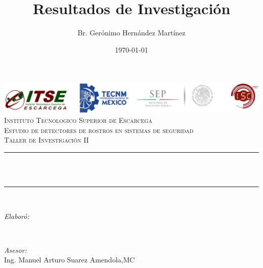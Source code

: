 \documentclass[12pt] {report}
\title{Resultados de Investigación}
\author{Br. Gerónimo Hernández Martínez}
\date{\today}
\makeatletter
\let\thetitle\@title
\let\theauthor\@author
\let\thedate\@date
\makeatother
\begin{document}

\begin{titlepage}
	\centering
    \vspace*{0.2 cm}
    \includegraphics[scale = 0.60]{log1.png}\\[3.0 cm]
          \textsc{\LARGE Instituto Tecnologico Superior de Escarcega}\\[2.0 cm]	%
	\textsc{\Large Estudio de detectores de rostros en sistemas de seguridad}\\[0.5 cm]				
	\textsc{\large Taller de Investigación II}\\[0.5 cm]				
	\rule{\linewidth}{0.2 mm} \\[0.4 cm]
	{ \huge \bfseries \thetitle}\\
    
	\rule{\linewidth}{0.2 mm} \\[1.5 cm]
	
	\begin{minipage}{0.4\textwidth}
		\begin{flushleft} \large
			\emph{Elaboró:}\\
			\theauthor
			\end{flushleft}
			\end{minipage}~
			\begin{minipage}{0.4\textwidth}
			\begin{flushright} \large
			\emph{Asesor:} \\
			Ing. Manuel Arturo Suarez Amendola,MC	
           
		\end{flushright}
        
	\end{minipage}\\[2 cm]
	
	{\large \thedate}\\[5 cm]
 
	\vfill
	
\end{titlepage}


\tableofcontents
\pagebreak

\end{document}
